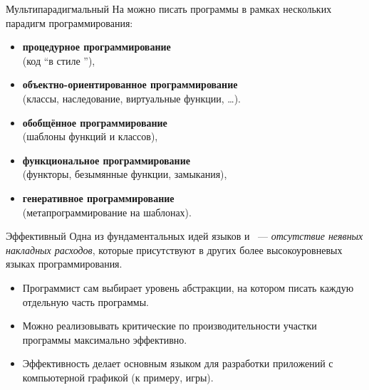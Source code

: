 \documentclass[aspectration=1610,t]{beamer}
\begin{document}
\begin{frame}{Мультипарадигмальный}
На \langcpp можно писать программы в рамках нескольких парадигм программирования:
    \begin{itemize}
        \item {\bf процедурное программирование}\\
            (код ``в стиле \langc''),
            
        \item {\bf объектно-ориентированное программирование}\\
            (классы, наследование, виртуальные функции, \dots).
            
        \item {\bf обобщённое программирование}\\
            (шаблоны функций и классов),

        \item {\bf функциональное программирование}\\
            (функторы, безымянные функции, замыкания),
            
        \item {\bf генеративное программирование}\\
            (метапрограммирование на шаблонах).
    \end{itemize}
\end{frame}

\begin{frame}{Эффективный}
Одна из фундаментальных идей языков \langc и \langcpp~--- {\em
отсутствие неявных накладных расходов}, которые присутствуют
в других более высокоуровневых языках программирования.


\begin{itemize}
\item   Программист сам выбирает уровень абстракции, на котором писать
каждую отдельную часть программы. 

\item   Можно реализовывать критические по производительности участки
программы максимально эффективно.

\item Эффективность делает \langcpp основным языком для разработки приложений
с компьютерной графикой (к примеру, игры).
\end{itemize}

\end{frame}
\end{document}
